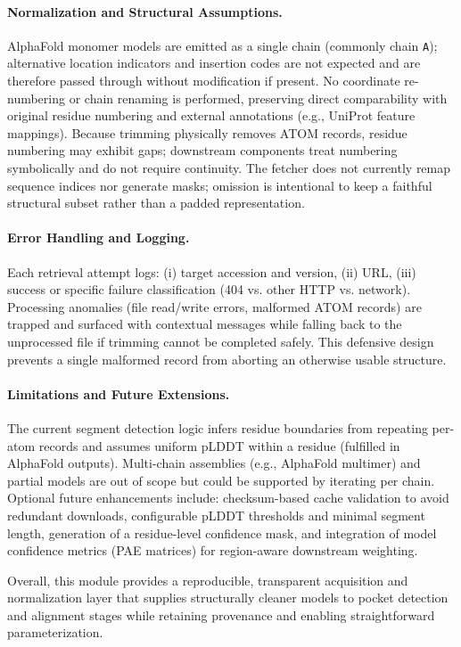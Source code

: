 \paragraph{Normalization and Structural Assumptions.} AlphaFold monomer models are emitted as a single chain (commonly chain \texttt{A}); alternative location indicators and insertion codes are not expected and are therefore passed through without modification if present. No coordinate re-numbering or chain renaming is performed, preserving direct comparability with original residue numbering and external annotations (e.g., UniProt feature mappings). Because trimming physically removes ATOM records, residue numbering may exhibit gaps; downstream components treat numbering symbolically and do not require continuity. The fetcher does not currently remap sequence indices nor generate masks; omission is intentional to keep a faithful structural subset rather than a padded representation.

\paragraph{Error Handling and Logging.} Each retrieval attempt logs: (i) target accession and version, (ii) URL, (iii) success or specific failure classification (404 vs. other HTTP vs. network). Processing anomalies (file read/write errors, malformed ATOM records) are trapped and surfaced with contextual messages while falling back to the unprocessed file if trimming cannot be completed safely. This defensive design prevents a single malformed record from aborting an otherwise usable structure.

\paragraph{Limitations and Future Extensions.} The current segment detection logic infers residue boundaries from repeating per-atom records and assumes uniform pLDDT within a residue (fulfilled in AlphaFold outputs). Multi-chain assemblies (e.g., AlphaFold multimer) and partial models are out of scope but could be supported by iterating per chain. Optional future enhancements include: checksum-based cache validation to avoid redundant downloads, configurable pLDDT thresholds and minimal segment length, generation of a residue-level confidence mask, and integration of model confidence metrics (PAE matrices) for region-aware downstream weighting.

Overall, this module provides a reproducible, transparent acquisition and normalization layer that supplies structurally cleaner models to pocket detection and alignment stages while retaining provenance and enabling straightforward parameterization.


